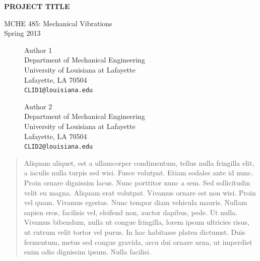 \documentclass[11pt]{article}
\begin{document}
\thispagestyle{empty}
\begin{center}
\vspace*{1.5in}
{\LARGE \textbf{PROJECT TITLE}} %

{\Large MCHE 485: Mechanical Vibrations\\ \vspace*{0.1in} Spring 2013}

\vspace*{2.5in}

\begin{figure}[!h]
\begin{minipage}{0.45\textwidth}
\begin{center}
Author 1 \\
Department of Mechanical Engineering\\
University of Louisiana at Lafayette\\
Lafayette, LA 70504\\
{\tt CLID1@louisiana.edu}
\end{center}
\end{minipage}
\hspace{0.08\textwidth}
\begin{minipage}{0.45\textwidth}
\begin{center}
Author 2 \\
Department of Mechanical Engineering\\
University of Louisiana at Lafayette\\
Lafayette, LA 70504\\
\tt{CLID2@louisiana.edu}
\end{center}
\end{minipage}
\end{figure}

\end{center}

\newpage
\thispagestyle{empty}
\begin{abstract}
\vspace{-0.2in}
Aliquam aliquet, est a ullamcorper condimentum, tellus nulla fringilla elit, a iaculis nulla turpis sed wisi. Fusce volutpat. Etiam sodales ante id nunc. Proin ornare dignissim lacus. Nunc porttitor nunc a sem. Sed sollicitudin velit eu magna. Aliquam erat volutpat. Vivamus ornare est non wisi. Proin vel quam. Vivamus egestas. Nunc tempor diam vehicula mauris. Nullam sapien eros, facilisis vel, eleifend non, auctor dapibus, pede. Ut nulla. Vivamus bibendum, nulla ut congue fringilla, lorem ipsum ultricies risus, ut rutrum velit tortor vel purus. In hac habitasse platea dictumst. Duis fermentum, metus sed congue gravida, arcu dui ornare urna, ut imperdiet enim odio dignissim ipsum. Nulla facilisi. 
\end{abstract} 
\end{document}
